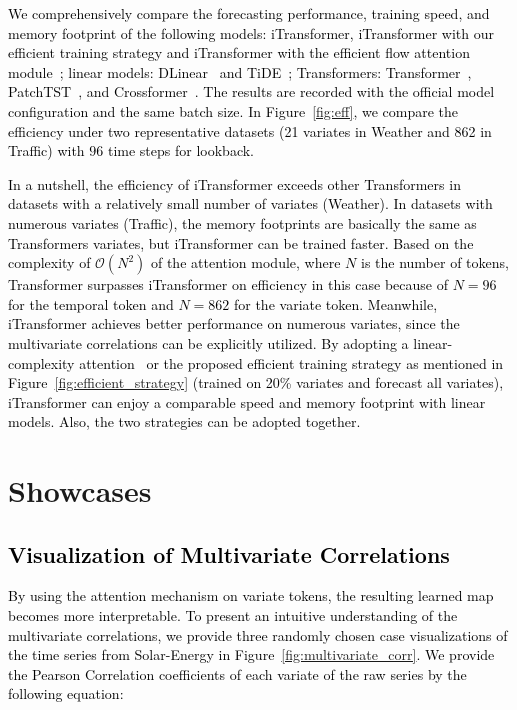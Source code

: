 \documentclass{article} %
\newcommand{\update}[1]{{\textcolor{black}{#1}}}
\begin{document}
\update{We comprehensively compare the forecasting performance, training speed, and memory footprint of the following models: iTransformer, iTransformer with our efficient training strategy and iTransformer with the efficient flow attention module~\citep{wu2022flowformer}; linear models: DLinear~\citep{DLinear} and TiDE~\citep{das2023long}; Transformers: Transformer~\citep{Transformer}, PatchTST~\citep{PatchTST}, and Crossformer~\citep{Crossformer}. The results are recorded with the official model configuration and the same batch size. In Figure~\ref{fig:eff}, we compare the efficiency under two representative datasets (21 variates in Weather and 862 in Traffic) with $96$ time steps for lookback.}

\update{In a nutshell, the efficiency of iTransformer exceeds other Transformers in datasets with a relatively small number of variates (Weather). In datasets with numerous variates (Traffic), the memory footprints are basically the same as Transformers variates, but iTransformer can be trained faster. Based on the complexity of $\mathcal{O}(N^2)$ of the attention module, where $N$ is the number of tokens, Transformer surpasses iTransformer on efficiency in this case because of $N=96$ for the temporal token and $N=862$ for the variate token. Meanwhile, iTransformer achieves better performance on numerous variates, since the multivariate correlations can be explicitly utilized. By adopting a linear-complexity attention~\citep{wu2022flowformer} or the proposed efficient training strategy as mentioned in Figure~\ref{fig:efficient_strategy} (trained on 20\% variates and forecast all variates), iTransformer can enjoy a comparable speed and memory footprint with linear models. Also, the two strategies can be adopted together.}

\section{Showcases}

\subsection{\update{Visualization of Multivariate Correlations}}\label{sec:app_vis}
\update{By using the attention mechanism on variate tokens, the resulting learned map becomes more interpretable. To present an intuitive understanding of the multivariate correlations, we provide three randomly chosen case visualizations of the time series from Solar-Energy in Figure~\ref{fig:multivariate_corr}. We provide the Pearson Correlation coefficients of each variate of the raw series by the following equation:}
\end{document}
